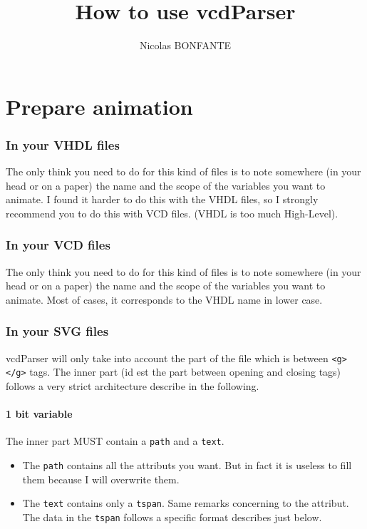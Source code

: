 \documentclass[a4paper]{article}
\author{Nicolas BONFANTE}
\title{How to use vcdParser}
\begin{document}
\maketitle
\tableofcontents
\newpage
\part{Prepare animation}
\newpage
\section{In your VHDL files}

The only think you need to do for this kind of files is to note somewhere (in your head or on a paper) the name and the scope of the variables you want to animate. I found it harder to do this with the VHDL files, so I strongly recommend you to do this with VCD files. (VHDL is too much High-Level).

\section{In your VCD files}

The only think you need to do for this kind of files is to note somewhere (in your head or on a paper) the name and the scope of the variables you want to animate. Most of cases, it corresponds to the VHDL name in lower case. 

\section{In your SVG files}

vcdParser will only take into account the part of the file which is between \texttt{<g></g>} tags. The inner part (id est the part between opening and closing tags) follows a very strict architecture describe in the following.

\subsection{1 bit variable}
The inner part MUST contain a \texttt{path} and a \texttt{text}. 
\begin{itemize}
\item The \texttt{path} contains all the attributs you want. But in fact it is useless to fill them because  I will overwrite them.
\item The \texttt{text} contains only a \texttt{tspan}. Same remarks concerning to the attribut. The data in the \texttt{tspan} follows a specific format describes just below.
\end{itemize}
\end{document}
